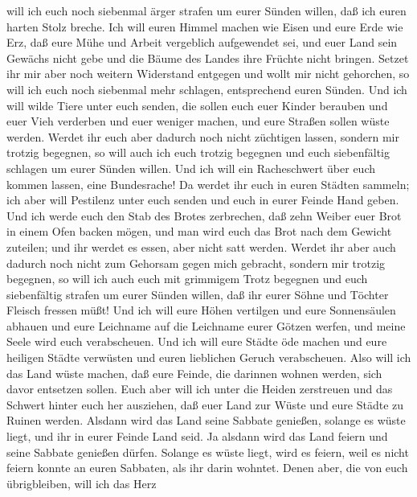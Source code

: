 will ich euch noch siebenmal ärger strafen um eurer Sünden willen,
 daß ich euren harten Stolz breche. Ich will euren Himmel
machen wie Eisen und eure Erde wie Erz,  daß eure Mühe
und Arbeit vergeblich aufgewendet sei, und euer Land sein Gewächs nicht
gebe und die Bäume des Landes ihre Früchte nicht bringen.
 Setzet ihr mir aber noch weitern Widerstand entgegen und
wollt mir nicht gehorchen, so will ich euch noch siebenmal mehr
schlagen, entsprechend euren Sünden.  Und ich will wilde
Tiere unter euch senden, die sollen euch euer Kinder berauben und euer
Vieh verderben und euer weniger machen, und eure Straßen sollen wüste
werden.  Werdet ihr euch aber dadurch noch nicht
züchtigen lassen, sondern mir trotzig begegnen,  so will
auch ich euch trotzig begegnen und euch siebenfältig schlagen um eurer
Sünden willen.  Und ich will ein Racheschwert über euch
kommen lassen, eine Bundesrache! Da werdet ihr euch in euren Städten
sammeln; ich aber will Pestilenz unter euch senden und euch in eurer
Feinde Hand geben.  Und ich werde euch den Stab des
Brotes zerbrechen, daß zehn Weiber euer Brot in einem Ofen backen mögen,
und man wird euch das Brot nach dem Gewicht zuteilen; und ihr werdet es
essen, aber nicht satt werden.  Werdet ihr aber auch
dadurch noch nicht zum Gehorsam gegen mich gebracht, sondern mir trotzig
begegnen,  so will ich auch euch mit grimmigem Trotz
begegnen und euch siebenfältig strafen um eurer Sünden willen,
 daß ihr eurer Söhne und Töchter Fleisch fressen müßt!
 Und ich will eure Höhen vertilgen und eure Sonnensäulen
abhauen und eure Leichname auf die Leichname eurer Götzen werfen, und
meine Seele wird euch verabscheuen.  Und ich will eure
Städte öde machen und eure heiligen Städte verwüsten und euren
lieblichen Geruch verabscheuen.  Also will ich das Land
wüste machen, daß eure Feinde, die darinnen wohnen werden, sich davor
entsetzen sollen.  Euch aber will ich unter die Heiden
zerstreuen und das Schwert hinter euch her ausziehen, daß euer Land zur
Wüste und eure Städte zu Ruinen werden.  Alsdann wird das
Land seine Sabbate genießen, solange es wüste liegt, und ihr in eurer
Feinde Land seid. Ja alsdann wird das Land feiern und seine Sabbate
genießen dürfen.  Solange es wüste liegt, wird es feiern,
weil es nicht feiern konnte an euren Sabbaten, als ihr darin wohntet.
 Denen aber, die von euch übrigbleiben, will ich das Herz
